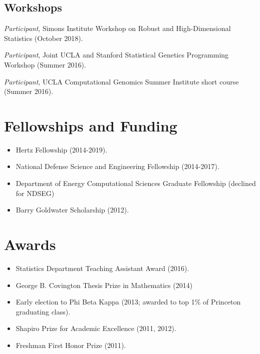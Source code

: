 \documentclass[letterpaper]{article}
\newenvironment{itemizenob}{
  \begin{list}{}{
    \setlength{\leftmargin}{1.5em}
  }
}{
  \end{list}
}
\begin{document}
\subsection*{Workshops}
\begin{itemizenob}\addtolength{\itemsep}{-0.2\baselineskip}
	\item {\em Participant}, Simons Institute Workshop on Robust and High-Dimensional Statistics (October 2018). %
	\item {\em Participant}, Joint UCLA and Stanford Statistical Genetics Programming Workshop (Summer 2016). %
	\item {\em Participant}, UCLA Computational Genomics Summer Institute short course (Summer 2016). %
\end{itemizenob}


\section*{Fellowships and Funding}
\begin{itemize}\addtolength{\itemsep}{-0.2\baselineskip}
	\item Hertz Fellowship (2014-2019).
	\item National Defense Science and Engineering Fellowship (2014-2017).
	\item Department of Energy Computational Sciences Graduate Fellowship (declined for NDSEG)	
	\item Barry Goldwater Scholarship (2012).
\end{itemize}

\section*{Awards}
\begin{itemize}\addtolength{\itemsep}{-0.2\baselineskip}
\item Statistics Department Teaching Assistant Award (2016).
\item George B. Covington Thesis Prize in Mathematics (2014)
\item Early election to Phi Beta Kappa (2013; awarded to top 1\% of Princeton graduating class).
\item Shapiro Prize for Academic Excellence (2011, 2012).
\item Freshman First Honor Prize (2011).
\end{itemize}
\end{document}
